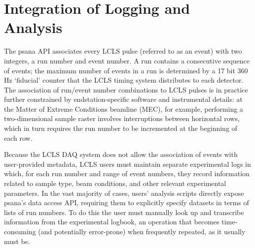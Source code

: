 \section{Integration of Logging and Analysis}
The psana API associates every LCLS pulse (referred to as an event) with two integers, a run number and event number. \cite{damiani2016linac} A run contains a consecutive sequence of events; the maximum number of events in a run is determined by a 17 bit 360 Hz `fiducial' counter that the LCLS timing system distributes to each detector. The association of run/event number combinations to LCLS pulses is in practice further constrained by endstation-specific software and instrumental details: at the Matter of Extreme Conditions beamline (MEC), for example, performing a two-dimensional sample raster involves interruptions between horizontal rows, which in turn requires the run number to be incremented at the beginning of each row. 

Because the LCLS DAQ system does not allow the association of events with user-provided metadata, LCLS users must maintain separate experimental logs in which, for each run number and range of event numbers, they record information related to sample type, beam conditions, and other relevant experimental parameters.  In the vast majority of cases, users' analysis scripts directly expose psana's data access API, requiring them to explicitly specify datasets in terms of lists of run numbers. To do this the user must manually look up and transcribe information from the experimental logbook, an operation that becomes time-consuming (and potentially error-prone) when frequently repeated, as it usually must be.

